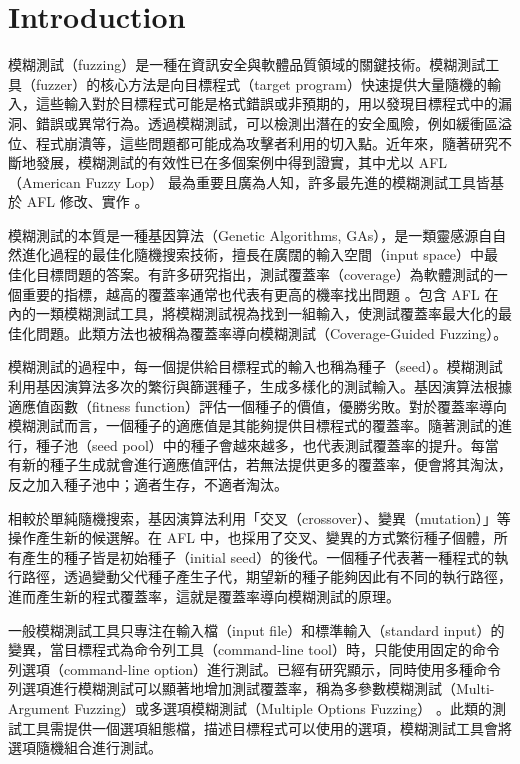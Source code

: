 \chapter{Introduction}
\label{ch:introduction}

模糊測試（fuzzing）是一種在資訊安全與軟體品質領域的關鍵技術。模糊測試工具（fuzzer）的核心方法是向目標程式（target program）快速提供大量隨機的輸入，這些輸入對於目標程式可能是格式錯誤或非預期的，用以發現目標程式中的漏洞、錯誤或異常行為。透過模糊測試，可以檢測出潛在的安全風險，例如緩衝區溢位、程式崩潰等，這些問題都可能成為攻擊者利用的切入點。近年來，隨著研究不斷地發展，模糊測試的有效性已在多個案例中得到證實，其中尤以 AFL（American Fuzzy Lop）\cite{zalewski2017afl} 最為重要且廣為人知，許多最先進的模糊測試工具皆基於 AFL 修改、實作 \cite{fioraldi2020afl++,pham2019smart,bohme2017directed}。

模糊測試的本質是一種基因算法（Genetic Algorithms, GAs）\cite{holland1992genetic}，是一類靈感源自自然進化過程的最佳化隨機搜索技術，擅長在廣闊的輸入空間（input space）中最佳化目標問題的答案。有許多研究指出，測試覆蓋率（coverage）為軟體測試的一個重要的指標，越高的覆蓋率通常也代表有更高的機率找出問題 \cite{kochhar2015code,bohme2022reliability}。包含 AFL 在內的一類模糊測試工具，將模糊測試視為找到一組輸入，使測試覆蓋率最大化的最佳化問題。此類方法也被稱為覆蓋率導向模糊測試（Coverage-Guided Fuzzing）。

模糊測試的過程中，每一個提供給目標程式的輸入也稱為種子（seed）。模糊測試利用基因演算法多次的繁衍與篩選種子，生成多樣化的測試輸入。基因演算法根據適應值函數（fitness function）評估一個種子的價值，優勝劣敗。對於覆蓋率導向模糊測試而言，一個種子的適應值是其能夠提供目標程式的覆蓋率。隨著測試的進行，種子池（seed pool）中的種子會越來越多，也代表測試覆蓋率的提升。每當有新的種子生成就會進行適應值評估，若無法提供更多的覆蓋率，便會將其淘汰，反之加入種子池中；適者生存，不適者淘汰。

相較於單純隨機搜索，基因演算法利用「交叉（crossover）、變異（mutation）」等操作產生新的候選解。在 AFL 中，也採用了交叉、變異的方式繁衍種子個體，所有產生的種子皆是初始種子（initial seed）的後代。一個種子代表著一種程式的執行路徑，透過變動父代種子產生子代，期望新的種子能夠因此有不同的執行路徑，進而產生新的程式覆蓋率，這就是覆蓋率導向模糊測試的原理。

一般模糊測試工具只專注在輸入檔（input file）和標準輸入（standard input）的變異，當目標程式為命令列工具（command-line tool）時，只能使用固定的命令列選項（command-line option）進行測試。已經有研究顯示，同時使用多種命令列選項進行模糊測試可以顯著地增加測試覆蓋率，稱為多參數模糊測試（Multi-Argument Fuzzing）或多選項模糊測試（Multiple Options Fuzzing） \cite{wu2020sq,tseng2023wei,lu2022guan,tsai2024Multiple} 。此類的測試工具需提供一個選項組態檔，描述目標程式可以使用的選項，模糊測試工具會將選項隨機組合進行測試。

